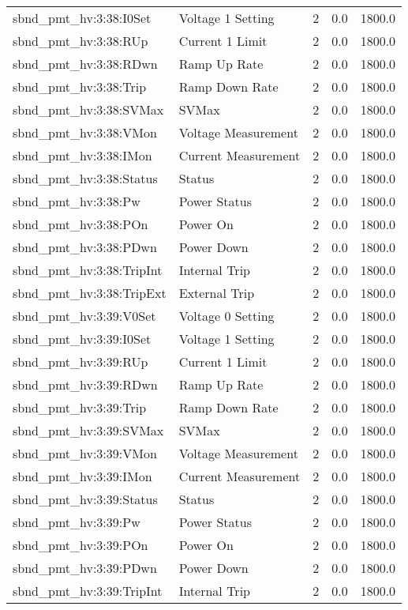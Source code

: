 \begin{center}
\begin{longtable}{l | l l l l }
sbnd\_pmt\_hv:3:38:I0Set & Voltage 1 Setting & 2 & 0.0 & 1800.0\\ 
sbnd\_pmt\_hv:3:38:RUp & Current 1 Limit & 2 & 0.0 & 1800.0\\ 
sbnd\_pmt\_hv:3:38:RDwn & Ramp Up Rate & 2 & 0.0 & 1800.0\\ 
sbnd\_pmt\_hv:3:38:Trip & Ramp Down Rate & 2 & 0.0 & 1800.0\\ 
sbnd\_pmt\_hv:3:38:SVMax & SVMax & 2 & 0.0 & 1800.0\\ 
sbnd\_pmt\_hv:3:38:VMon & Voltage Measurement & 2 & 0.0 & 1800.0\\ 
sbnd\_pmt\_hv:3:38:IMon & Current Measurement & 2 & 0.0 & 1800.0\\ 
sbnd\_pmt\_hv:3:38:Status & Status & 2 & 0.0 & 1800.0\\ 
sbnd\_pmt\_hv:3:38:Pw & Power Status & 2 & 0.0 & 1800.0\\ 
sbnd\_pmt\_hv:3:38:POn & Power On & 2 & 0.0 & 1800.0\\ 
sbnd\_pmt\_hv:3:38:PDwn & Power Down & 2 & 0.0 & 1800.0\\ 
sbnd\_pmt\_hv:3:38:TripInt & Internal Trip & 2 & 0.0 & 1800.0\\ 
sbnd\_pmt\_hv:3:38:TripExt & External Trip & 2 & 0.0 & 1800.0\\ 
sbnd\_pmt\_hv:3:39:V0Set & Voltage 0 Setting & 2 & 0.0 & 1800.0\\ 
sbnd\_pmt\_hv:3:39:I0Set & Voltage 1 Setting & 2 & 0.0 & 1800.0\\ 
sbnd\_pmt\_hv:3:39:RUp & Current 1 Limit & 2 & 0.0 & 1800.0\\ 
sbnd\_pmt\_hv:3:39:RDwn & Ramp Up Rate & 2 & 0.0 & 1800.0\\ 
sbnd\_pmt\_hv:3:39:Trip & Ramp Down Rate & 2 & 0.0 & 1800.0\\ 
sbnd\_pmt\_hv:3:39:SVMax & SVMax & 2 & 0.0 & 1800.0\\ 
sbnd\_pmt\_hv:3:39:VMon & Voltage Measurement & 2 & 0.0 & 1800.0\\ 
sbnd\_pmt\_hv:3:39:IMon & Current Measurement & 2 & 0.0 & 1800.0\\ 
sbnd\_pmt\_hv:3:39:Status & Status & 2 & 0.0 & 1800.0\\ 
sbnd\_pmt\_hv:3:39:Pw & Power Status & 2 & 0.0 & 1800.0\\ 
sbnd\_pmt\_hv:3:39:POn & Power On & 2 & 0.0 & 1800.0\\ 
sbnd\_pmt\_hv:3:39:PDwn & Power Down & 2 & 0.0 & 1800.0\\ 
sbnd\_pmt\_hv:3:39:TripInt & Internal Trip & 2 & 0.0 & 1800.0\\ 

\end{longtable}
\end{center}

